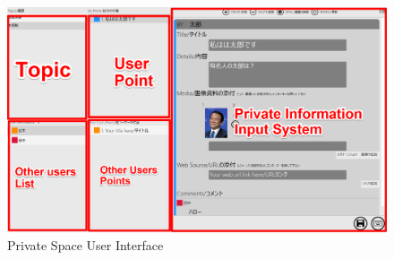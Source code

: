 \documentclass{sigchi}
\begin{document}
\begin{figure}
\centering
\includegraphics[width=1.0\columnwidth]{private}
\caption{Private Space User Interface}
\label{fig:figure1}
\end{figure}
\end{document}
